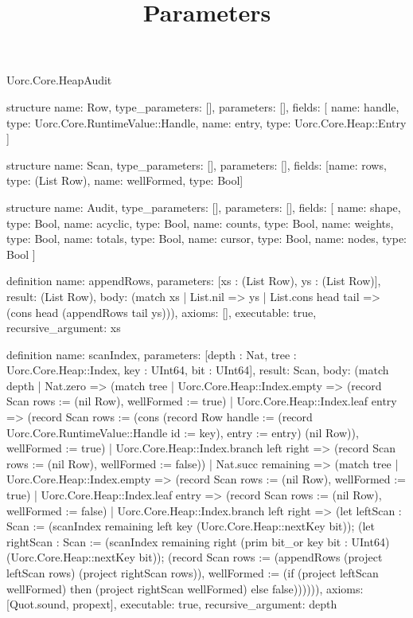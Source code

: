\begin{lexlean}{Uorc.Core.HeapAudit}
\title{Parameters}
\begin{semanticmodule}
structure{
  name: Row,
  type_parameters: [],
  parameters: [],
  fields: [
    {name: handle, type: Uorc.Core.RuntimeValue::Handle},
    {name: entry, type: Uorc.Core.Heap::Entry}
  ]
}

structure{
  name: Scan,
  type_parameters: [],
  parameters: [],
  fields: [{name: rows, type: (List Row)}, {name: wellFormed, type: Bool}]
}

structure{
  name: Audit,
  type_parameters: [],
  parameters: [],
  fields: [
    {name: shape, type: Bool},
    {name: acyclic, type: Bool},
    {name: counts, type: Bool},
    {name: weights, type: Bool},
    {name: totals, type: Bool},
    {name: cursor, type: Bool},
    {name: nodes, type: Bool}
  ]
}

definition{
  name: appendRows,
  parameters: [xs : (List Row), ys : (List Row)],
  result: (List Row),
  body: (match xs | List.nil => ys | List.cons head tail => (cons head (appendRows tail ys))),
  axioms: [],
  executable: true,
  recursive_argument: xs
}

definition{
  name: scanIndex,
  parameters: [depth : Nat, tree : Uorc.Core.Heap::Index, key : UInt64, bit : UInt64],
  result: Scan,
  body: (match depth
    | Nat.zero => (match tree
      | Uorc.Core.Heap::Index.empty => (record Scan {rows := (nil Row), wellFormed := true})
      | Uorc.Core.Heap::Index.leaf entry => (record Scan {rows := (cons (record Row {handle := (record Uorc.Core.RuntimeValue::Handle {id := key}), entry := entry}) (nil Row)), wellFormed := true})
      | Uorc.Core.Heap::Index.branch left right => (record Scan {rows := (nil Row), wellFormed := false}))
    | Nat.succ remaining => (match tree
      | Uorc.Core.Heap::Index.empty => (record Scan {rows := (nil Row), wellFormed := true})
      | Uorc.Core.Heap::Index.leaf entry => (record Scan {rows := (nil Row), wellFormed := false})
      | Uorc.Core.Heap::Index.branch left right => (let leftScan : Scan := (scanIndex remaining left key (Uorc.Core.Heap::nextKey bit)); (let rightScan : Scan := (scanIndex remaining right (prim bit_or key bit : UInt64) (Uorc.Core.Heap::nextKey bit)); (record Scan {rows := (appendRows (project leftScan rows) (project rightScan rows)), wellFormed := (if (project leftScan wellFormed) then (project rightScan wellFormed) else false)}))))),
  axioms: [Quot.sound, propext],
  executable: true,
  recursive_argument: depth
}


\end{semanticmodule}
\end{lexlean}
